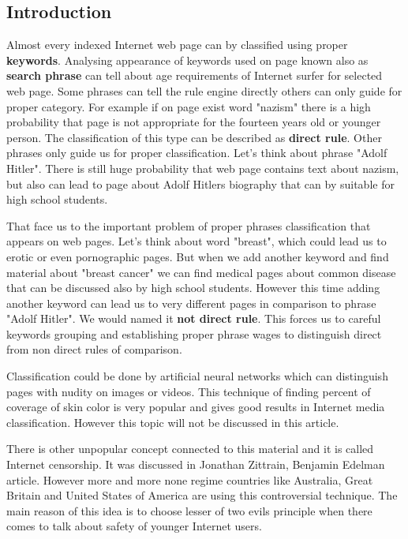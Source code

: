 \documentclass[9pt,a4paper]{extarticle}
\begin{document}
\begin{multicols}{2}
\section{Introduction}
Almost every indexed Internet web page can by classified using proper \textbf{keywords}. Analysing appearance of keywords used on page known also as \textbf{search phrase} can tell about age requirements of Internet surfer for selected web page. Some phrases can tell the rule engine directly others can only guide for proper category. For example if on page exist word "nazism" there is a high probability that page is not appropriate for the fourteen years old or younger person. The classification of this type can be described as \textbf{direct rule}. Other phrases only guide us for proper classification. Let's think about phrase "Adolf Hitler". There is still huge probability that web page contains text about nazism, but also can lead to page about Adolf Hitlers biography that can by suitable for high school students.

That face us to the important problem of proper phrases classification that appears on web pages. Let's think about word "breast", which could lead us to erotic or even pornographic pages. But when we add another keyword and find material about "breast cancer" we can find medical pages about common disease that can be discussed also by high school students. However this time adding another keyword can lead us to very different pages in comparison to phrase "Adolf Hitler". We would named it \textbf{not direct rule}. This forces us to careful keywords grouping and establishing proper phrase wages to distinguish direct from non direct rules of comparison.

Classification could be done by artificial neural networks which can distinguish pages with nudity on images or videos\cite{will_archer_arentz_classifying_nodate, radhouane_guermazi_combining_2007, giuseppe_amato_detection_2009}. This technique of finding percent of coverage of skin color is very popular and gives good results in Internet media classification\cite{mohammad_reza_mahmoodi_high_nodate,paul_greenfield_netalert_2001}. However this topic will not be discussed in this article.

There is other unpopular concept connected to this material and it is called Internet censorship. It was discussed in Jonathan Zittrain, Benjamin Edelman article\cite{jonathan_zittrain_internet_2003}. However more and more none regime countries like Australia, Great Britain and United States of America are using this controversial technique. The main reason of this idea is to choose lesser of two evils principle when there comes to talk about safety of younger Internet users\cite{piotr_luczuk_cyberwojna_2016,john_g._palfrey_jr._four_2010}.


\end{multicols}
\end{document}
